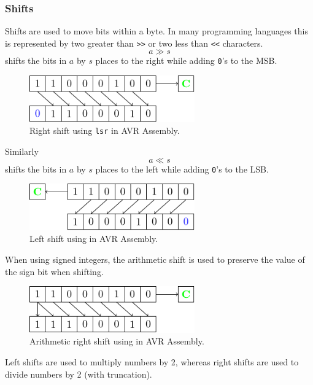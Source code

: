 \documentclass{article}
\newcommand{\keyword}[1]{\textcolor[rgb]{0.00,0.50,0.00}{\textbf{#1}}}
\begin{document}
\subsubsection{Shifts}
Shifts are used to move bits within a byte. In many programming languages this is represented by two greater than \texttt{>>} or two less than \texttt{<<} characters.
\begin{equation*}
    a \gg s
\end{equation*}
shifts the bits in \(a\) by \(s\) places to the right while adding \texttt{0}'s to the MSB.\
\begin{figure}[H]
    \centering
    \includegraphics[height = 2cm, keepaspectratio = true]{figures/logical_right_shift.pdf}
    \caption{Right shift using \texttt{lsr} in AVR Assembly.} %
\end{figure}
Similarly
\begin{equation*}
    a \ll s
\end{equation*}
shifts the bits in \(a\) by \(s\) places to the left while adding \texttt{0}'s to the LSB.\
\begin{figure}[H]
    \centering
    \includegraphics[height = 2cm, keepaspectratio = true]{figures/logical_left_shift.pdf}
    \caption{Left shift using \keyword{} in AVR Assembly.} %
\end{figure}
When using signed integers, the arithmetic shift is used to preserve the value of the sign bit when shifting.
\begin{figure}[H]
    \centering
    \includegraphics[height = 2cm, keepaspectratio = true]{figures/arithmetic_right_shift.pdf}
    \caption{Arithmetic right shift using \keyword{} in AVR Assembly.} %
\end{figure}
Left shifts are used to multiply numbers by 2, whereas right shifts are used to divide numbers by 2 (with truncation).
\end{document}
